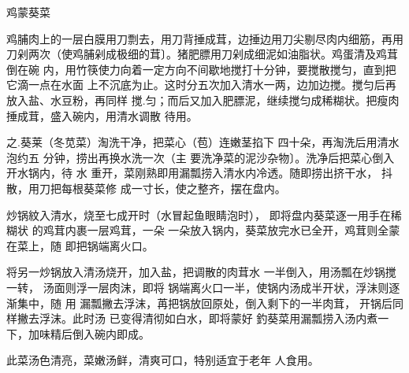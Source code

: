 \begin{recipe}{鸡蒙葵菜}

\ingredients


\preparation

\step 鸡脯肉上的一层白膜用刀剽去，用刀背捶成茸，边捶边用刀尖剔尽肉内细筋，再用
刀剁两次（使鸡脯剁成极细的茸〕。猪肥膘用刀剁成细泥如油脂状。鸡蛋清及鸡茸倒在碗
内，用竹筷使力向着一定方向不间歇地搅打十分钟，要搅散搅匀，直到把它滴一点在水面
上不沉底为止。这时分五次加入清水一两，边加边搅。搅匀后再放入盐、水豆粉，再同样
搅.匀；而后又加入肥膘泥，继续搅匀成稀糊状。把瘦肉捶成茸，盛入碗内，用清水调散
待用。

之.葵莱（冬苋菜）淘洗干净，把菜心（苞）连嫩茎掐下 四十朵，再淘洗后用清水泡约五
分钟，捞出再换水洗一次（主 要洗净菜的泥沙杂物〕。洗净后把菜心倒入开水锅内，待
水 重开，菜刚熟即用漏瓢捞入清水内冷透。随即捞出挤干水， 抖散，用刀把每根葵菜修
成一寸长，使之整齐，摆在盘内。

炒锅紋入清水，烧至七成开时（水冒起鱼眼睛泡时）， 即将盘内葵菜逐一用手在稀糊状
的鸡茸内裹一层鸡茸，一朵 一朵放入锅内，葵菜放完水已全开，鸡茸则全蒙在菜上，随
即把锅端离火口。

将另一炒锅放入清汤烧开，加入盐，把调散的肉茸水 一半倒入，用汤瓢在炒锅搅一转，
汤面则浮一层肉沫，即将 锅端离火口一半，使锅内汤成半开状，浮沬则逐渐集中，随 用
漏瓢撇去浮沫，苒把锅放回原处，倒入剩下的一半肉茸， 开锅后同样撇去浮沫。此时汤
已变得清彻如白水，即将蒙好 釣葵菜用漏瓢捞入汤内煮一下，加味精后倒入碗内即成。

\features

此菜汤色清亮，菜嫩汤鲜，清爽可口，特别适宜于老年 人食用。

\end{recipe}

